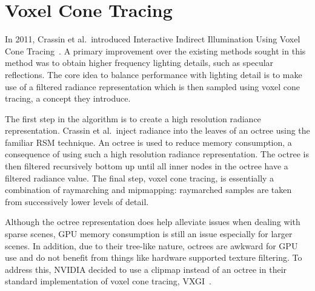 \section{Voxel Cone Tracing}
In 2011, Crassin et al.\ introduced Interactive Indirect Illumination Using Voxel Cone Tracing~\cite{crassin2011interactive}. A primary improvement over the existing methods sought in this method was to obtain higher frequency lighting details, such as specular reflections. The core idea to balance performance  with lighting detail is to make use of a filtered radiance representation which is then sampled using voxel cone tracing, a concept they introduce.

The first step in the algorithm is to create a high resolution radiance representation. Crassin et al.\ inject radiance into the leaves of an octree using the familiar RSM technique. An octree is used to reduce memory consumption, a consequence of using such a high resolution radiance representation. The octree is then filtered recursively bottom up until all inner nodes in the octree have a filtered radiance value. The final step, voxel cone tracing, is essentially a combination of raymarching and mipmapping: raymarched samples are taken from successively lower levels of detail.


Although the octree representation does help alleviate issues when dealing with sparse scenes, GPU memory consumption is still an issue especially for larger scenes. In addition, due to their tree-like nature, octrees are awkward for GPU use and do not benefit from things like hardware supported texture filtering. To address this, NVIDIA decided to use a clipmap instead of an octree in their standard implementation of voxel cone tracing, VXGI~\cite{nvidiavxgi}.


\iffalse

* Global Illumination using Voxel Cone Tracing
- octrees vs clipmaps vs 3d textures (vs warped)
- proprietary
- vxgi: clipmaps, in UE4 but still closed source
    - octree -> no hw filtering, complex but higher resolution
    - multiple levels of radiance -> allows gathering more high frequency indirect lighting information

* some common issues with other works (this could also go in intro)
- closed source
- implementation details matter -> difficult to understand from research or white papers
- highly variable performance based on unrelated things (OpenGL vs DirectX? modern OpenGL? mipmaps, normal maps, shading model, mesh optimizations, etc)
- research renderers or full game engines -> difficult to understand
\fi